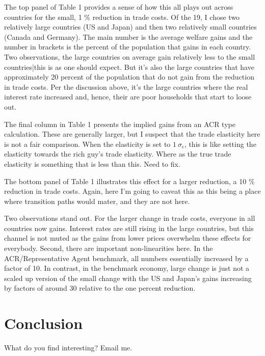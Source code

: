\documentclass[12pt,pdftex]{article}
\begin{document}
\begin{onehalfspacing}
The top panel of Table 1 provides a sense of how this all plays out across countries for the small, 1 \% reduction in trade costs. Of the 19, I chose two relatively large countries (US and Japan) and then two relatively small countries (Canada and Germany). The main number is the average welfare gains and the number in brackets is the percent of the population that gains in each country. Two observations, the large countries on average gain relatively less to the small countries|this is as one should expect. But it's also the large countries that have approximately 20 percent of the population that do not gain from the reduction in trade costs. Per the discussion above, it's the large countries where the real interest rate increased and, hence, their are poor households that start to loose out.

The final column in Table 1 presents the implied gains from an ACR type calculation. These are generally larger, but I suspect that the trade elasticity here is not a fair comparison. When the elasticity is set to $1 \ \sigma_{\epsilon}$, this is like setting the elasticity towards the rich guy's trade elasticity. Where as the true trade elasticity is something that is less than this. Need to fix. 


The bottom panel of Table 1 illustrates this effect for a larger reduction, a 10 \% reduction in trade costs. Again, here I'm going to caveat this as this being a place where transition paths would mater, and they are not here. 

Two observations stand out. For the larger change in trade costs, everyone in all countries now gains. Interest rates are still rising in the large countries, but this channel is not muted as the gains from lower prices overwhelm these effects for everybody. Second, there are important non-linearities here. In the ACR/Representative Agent benchmark, all numbers essentially increased by a factor of 10. In contrast, in the benchmark economy, large change is just not a scaled up version of the small change with the US and Japan's gains increasing by factors of around 30 relative to the one percent reduction. 


\section{Conclusion}

 What do you find interesting? Email me. 



\appendix


\end{onehalfspacing}
\end{document}
